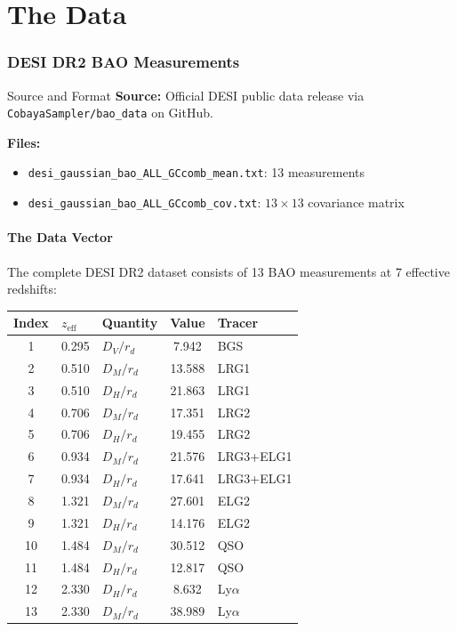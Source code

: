 \documentclass[11pt,a4paper]{article}
\begin{document}
\part{The Data}

\section{DESI DR2 BAO Measurements}
\label{sec:data}

\begin{databox}{Source and Format}
\textbf{Source:} Official DESI public data release via \texttt{CobayaSampler/bao\_data} on GitHub.

\textbf{Files:}
\begin{itemize}
    \item \texttt{desi\_gaussian\_bao\_ALL\_GCcomb\_mean.txt}: 13 measurements
    \item \texttt{desi\_gaussian\_bao\_ALL\_GCcomb\_cov.txt}: $13 \times 13$ covariance matrix
\end{itemize}
\end{databox}

\subsection{The Data Vector}

The complete DESI DR2 dataset consists of 13 BAO measurements at 7 effective redshifts:

\begin{center}
\begin{tabular}{cllcl}
\toprule
\textbf{Index} & \textbf{$z_{\text{eff}}$} & \textbf{Quantity} & \textbf{Value} & \textbf{Tracer} \\
\midrule
1 & 0.295 & $D_V/r_d$ & 7.942 & BGS \\
2 & 0.510 & $D_M/r_d$ & 13.588 & LRG1 \\
3 & 0.510 & $D_H/r_d$ & 21.863 & LRG1 \\
4 & 0.706 & $D_M/r_d$ & 17.351 & LRG2 \\
5 & 0.706 & $D_H/r_d$ & 19.455 & LRG2 \\
6 & 0.934 & $D_M/r_d$ & 21.576 & LRG3+ELG1 \\
7 & 0.934 & $D_H/r_d$ & 17.641 & LRG3+ELG1 \\
8 & 1.321 & $D_M/r_d$ & 27.601 & ELG2 \\
9 & 1.321 & $D_H/r_d$ & 14.176 & ELG2 \\
10 & 1.484 & $D_M/r_d$ & 30.512 & QSO \\
11 & 1.484 & $D_H/r_d$ & 12.817 & QSO \\
12 & 2.330 & $D_H/r_d$ & 8.632 & Ly$\alpha$ \\
13 & 2.330 & $D_M/r_d$ & 38.989 & Ly$\alpha$ \\
\bottomrule
\end{tabular}
\end{center}
\end{document}
